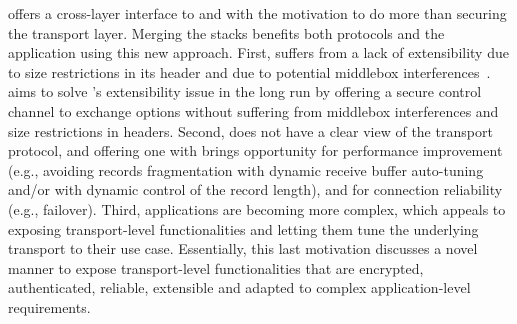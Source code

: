 

\tcpls offers a cross-layer interface to \tls and \tcp
with the motivation to do more than securing the transport layer. Merging the
stacks benefits both
protocols
and the application using this new approach. First, \tcp suffers from a lack of
extensibility due to size restrictions in its header and due to
potential middlebox interferences~\cite{honda2011still}. \tcpls aims to solve
\tcp's extensibility issue in the long run by offering a secure control channel
to exchange \tcp options without suffering from middlebox interferences and size restrictions in \tcp headers.
Second, \tls does not have a clear view of the transport protocol, and offering
one with \tcpls brings opportunity for performance improvement (e.g., avoiding
records fragmentation with dynamic receive buffer auto-tuning and/or with
dynamic control of the record length), and
for connection reliability (e.g., failover).  Third, applications are becoming
more complex, which appeals to exposing transport-level
functionalities and letting them tune the underlying transport to their use case.
Essentially, this last motivation discusses a novel manner to expose
transport-level functionalities that are encrypted, authenticated, reliable,
extensible and adapted to complex application-level requirements.


